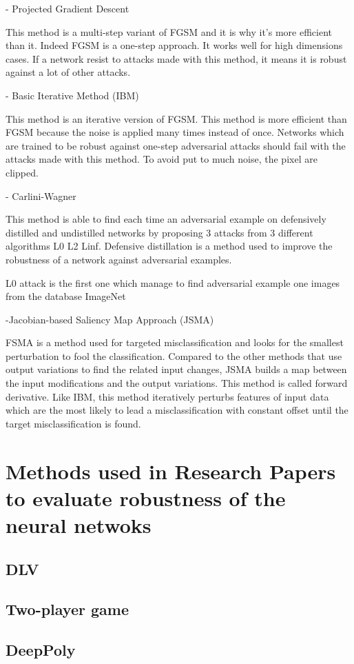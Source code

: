 - Projected Gradient Descent

This method is a multi-step variant of FGSM and it is why it's more efficient than it. Indeed FGSM is a one-step approach.
It works well for high dimensions cases. 
If a network resist to attacks made with this method, it means it is robust against a lot of other attacks.


- Basic Iterative Method (IBM)

This method is an iterative version of FGSM. This method is more efficient than FGSM because the noise is applied many times instead of once.  Networks which are trained to be robust against one-step adversarial attacks should fail with the attacks made with this method. To avoid put to much noise, the pixel are clipped.


- Carlini-Wagner

This method is able to find each time an adversarial example on defensively distilled and undistilled networks by proposing  3 attacks from 3  different algorithms L0 L2 Linf.  Defensive distillation is a method used to improve the robustness of a network against adversarial examples.

L0 attack  is the first one which manage to find adversarial example one images from the database ImageNet


-Jacobian-based Saliency Map Approach (JSMA)

FSMA is a method  used for targeted misclassification and looks for the smallest perturbation to fool the classification. Compared to the other methods that use output variations to find the related input changes, JSMA builds a map between the input modifications and the output variations. This method is called forward derivative. Like IBM, this method iteratively perturbs features of input data which are the most likely to lead a misclassification with constant offset until the target misclassification is found.

 















\section{Methods used in Research Papers to evaluate robustness of the neural netwoks}
\subsection {DLV}
\subsection {Two-player game}
\subsection {DeepPoly}

